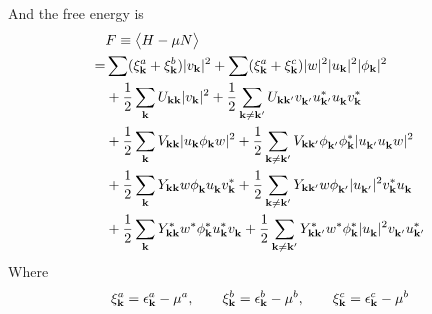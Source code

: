 And the free energy is 
\begin{equation}
 \begin{split}
  &F\equiv\av{H-\mu{}N}\\
    =&\sum(\xi^a_\vk+\xi^b_\vk)\abs{v_\vk}^2+\sum(\xi^a_\vk+\xi^c_\vk)\abs{w}^2\abs{u_\vk}^2\abs{\phi_\vk}^2\\
    &+\nth2\sum_{\vk}U_{\vk\vk}\abs{v_\vk}^2+\nth2\sum_{\vk\neq\vk'}U_{\vk\vk'}v^{}_{\vk'}u^*_{\vk'}u^{}_\vk{}v^*_\vk\\
    &+\nth2\sum_{\vk}V_{\vk\vk}\abs{u_\vk\phi_\vk{}w}^2
      +\nth2\sum_{\vk\neq\vk'}V_{\vk\vk'}\phi^{}_{\vk'}\phi^*_\vk\abs{u^{}_{\vk'}u^{}_\vk{}w}^2\\
    &+\nth2\sum_{\vk}Y_{\vk\vk}w\phi^{}_{\vk}{u^{}_{\vk}}v^*_\vk{}
      +\nth2\sum_{\vk\neq\vk'}Y_{\vk\vk'}w\phi^{}_{\vk'}\abs{u^{}_{\vk'}}^2v^*_\vk{}u^{}_\vk\\
    &+\nth2\sum_{\vk}Y^*_{\vk\vk}w^*\phi^{*}_{\vk}{u^{*}_{\vk}}v^{}_{\vk}{}
      +\nth2\sum_{\vk\neq\vk'}Y^*_{\vk\vk'}w^*\phi^{*}_{\vk}\abs{u^{}_{\vk}}^2v^{}_{\vk'}{}u^{*}_{\vk'}\\
 \end{split}
\end{equation}
Where 
\begin{equation*}
 \xi^a_\vk=\epsilon^a_\vk-\mu^a,\qquad\xi^b_\vk=\epsilon^b_\vk-\mu^b,\qquad\xi^c_\vk=\epsilon^c_\vk-\mu^b
\end{equation*}

